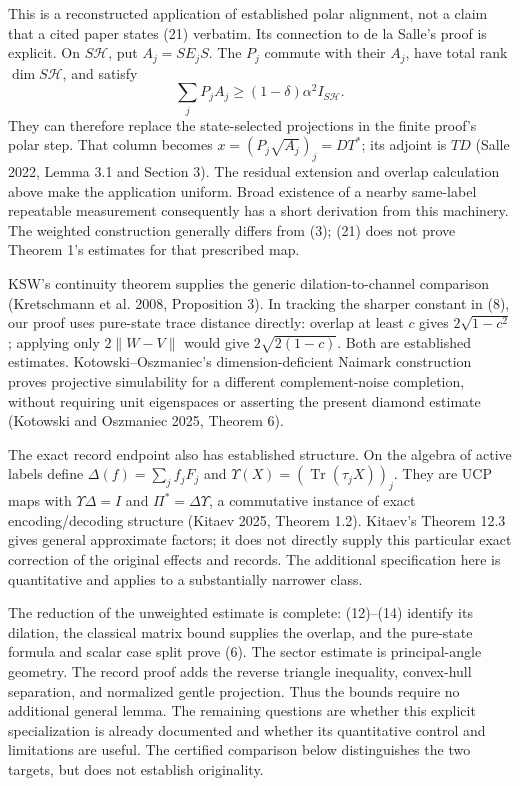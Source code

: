 \documentclass[
  11pt,
  a4paper,
]{article}
\begin{document}
This is a reconstructed application of established polar alignment, not
a claim that a cited paper states (21) verbatim. Its connection to de la
Salle's proof is explicit. On \(S\mathcal H\), put \(A_j=SE_jS\). The
\(P_j\) commute with their \(A_j\), have total rank
\(\dim S\mathcal H\), and satisfy
\[\sum_jP_jA_j\ge(1-\delta)\alpha^2I_{S\mathcal H}.\] They can therefore
replace the state-selected projections in the finite proof's polar step.
That column becomes \(x=(P_j\sqrt{A_j})_j=DT^*\); its adjoint is \(TD\)
(Salle 2022, Lemma 3.1 and Section 3). The residual extension and
overlap calculation above make the application uniform. Broad existence
of a nearby same-label repeatable measurement consequently has a short
derivation from this machinery. The weighted construction generally
differs from (3); (21) does not prove Theorem 1's estimates for that
prescribed map.

KSW's continuity theorem supplies the generic dilation-to-channel
comparison (Kretschmann et al. 2008, Proposition 3). In tracking the
sharper constant in (8), our proof uses pure-state trace distance
directly: overlap at least \(c\) gives \(2\sqrt{1-c^2}\); applying only
\(2\|W-V\|\) would give \(2\sqrt{2(1-c)}\). Both are established
estimates. Kotowski--Oszmaniec's dimension-deficient Naimark
construction proves projective simulability for a different
complement-noise completion, without requiring unit eigenspaces or
asserting the present diamond estimate (Kotowski and Oszmaniec 2025,
Theorem 6).

The exact record endpoint also has established structure. On the algebra
of active labels define \(\Delta(f)=\sum_jf_jF_j\) and
\(\Upsilon(X)=(\operatorname{Tr}(\tau_jX))_j\). They are UCP maps with
\(\Upsilon\Delta=I\) and \(\Pi^*=\Delta\Upsilon\), a commutative
instance of exact encoding/decoding structure (Kitaev 2025, Theorem
1.2). Kitaev's Theorem 12.3 gives general approximate factors; it does
not directly supply this particular exact correction of the original
effects and records. The additional specification here is quantitative
and applies to a substantially narrower class.

The reduction of the unweighted estimate is complete: (12)--(14)
identify its dilation, the classical matrix bound supplies the overlap,
and the pure-state formula and scalar case split prove (6). The sector
estimate is principal-angle geometry. The record proof adds the reverse
triangle inequality, convex-hull separation, and normalized gentle
projection. Thus the bounds require no additional general lemma. The
remaining questions are whether this explicit specialization is already
documented and whether its quantitative control and limitations are
useful. The certified comparison below distinguishes the two targets,
but does not establish originality.
\end{document}
